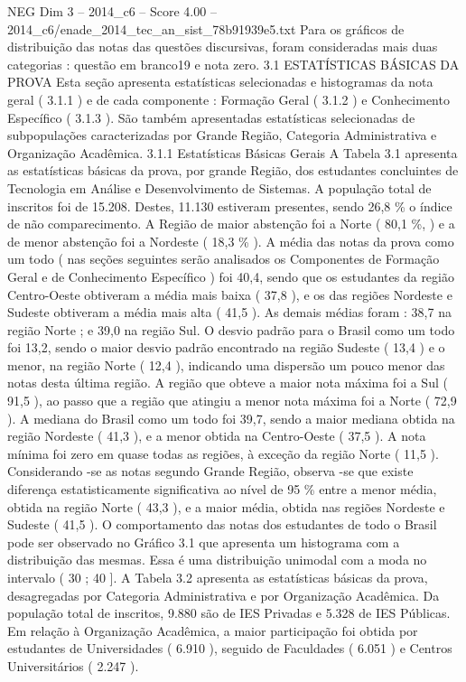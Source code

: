 \begin{textsample}{NEG Dim 3 – 2014\_c6 – Score 4.00 – 2014\_c6/enade\_2014\_tec\_an\_sist\_78b91939e5.txt}
Para os gráficos de distribuição das notas das questões discursivas, foram consideradas mais duas categorias : questão em branco19 e nota zero. 3.1 ESTATÍSTICAS BÁSICAS DA PROVA Esta seção apresenta estatísticas selecionadas e histogramas da nota geral ( 3.1.1 ) e de cada componente : Formação Geral ( 3.1.2 ) e Conhecimento Específico ( 3.1.3 ).
São também apresentadas estatísticas selecionadas de subpopulações caracterizadas por Grande Região, Categoria Administrativa e Organização Acadêmica. 3.1.1 Estatísticas Básicas Gerais A Tabela 3.1 apresenta as estatísticas básicas da prova, por grande Região, dos estudantes concluintes de Tecnologia em Análise e Desenvolvimento de Sistemas.
A população total de inscritos foi de 15.208.
Destes, 11.130 estiveram presentes, sendo 26,8 \% o índice de não comparecimento.
A Região de maior abstenção foi a Norte ( 80,1 \%, ) e a de menor abstenção foi a Nordeste ( 18,3 \% ).
A média das notas da prova como um todo ( nas seções seguintes serão analisados os Componentes de Formação Geral e de Conhecimento Específico ) foi 40,4, sendo que os estudantes da região Centro-Oeste obtiveram a média mais baixa ( 37,8 ), e os das regiões Nordeste e Sudeste obtiveram a média mais alta ( 41,5 ).
As demais médias foram : 38,7 na região Norte ; e 39,0 na região Sul.
O desvio padrão para o Brasil como um todo foi 13,2, sendo o maior desvio padrão encontrado na região Sudeste ( 13,4 ) e o menor, na região Norte ( 12,4 ), indicando uma dispersão um pouco menor das notas desta última região.
A região que obteve a maior nota máxima foi a Sul ( 91,5 ), ao passo que a região que atingiu a menor nota máxima foi a Norte ( 72,9 ).
A mediana do Brasil como um todo foi 39,7, sendo a maior mediana obtida na região Nordeste ( 41,3 ), e a menor obtida na Centro-Oeste ( 37,5 ).
A nota mínima foi zero em quase todas as regiões, à exceção da região Norte ( 11,5 ).
Considerando -se as notas segundo Grande Região, observa -se que existe diferença estatisticamente significativa ao nível de 95 \% entre a menor média, obtida na região Norte ( 43,3 ), e a maior média, obtida nas regiões Nordeste e Sudeste ( 41,5 ).
O comportamento das notas dos estudantes de todo o Brasil pode ser observado no Gráfico 3.1 que apresenta um histograma com a distribuição das mesmas.
Essa é uma distribuição unimodal com a moda no intervalo ( 30 ; 40 ].
A Tabela 3.2 apresenta as estatísticas básicas da prova, desagregadas por Categoria Administrativa e por Organização Acadêmica.
Da população total de inscritos, 9.880 são de IES Privadas e 5.328 de IES Públicas.
Em relação à Organização Acadêmica, a maior participação foi obtida por estudantes de Universidades ( 6.910 ), seguido de Faculdades ( 6.051 ) e Centros Universitários ( 2.247 ).

\end{textsample}
